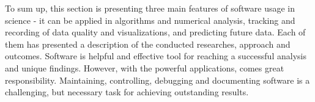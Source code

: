 To sum up, this section is presenting three main features of software usage in science - it can be applied in algorithms and numerical analysis, tracking and recording of data quality and visualizations, and predicting future data. Each of them has presented a description of the conducted researches, approach and outcomes. Software is helpful and effective tool for reaching a successful analysis and unique findings. However, with the powerful applications, comes great responsibility. Maintaining, controlling, debugging and documenting software is a challenging, but necessary task for achieving outstanding results. 
